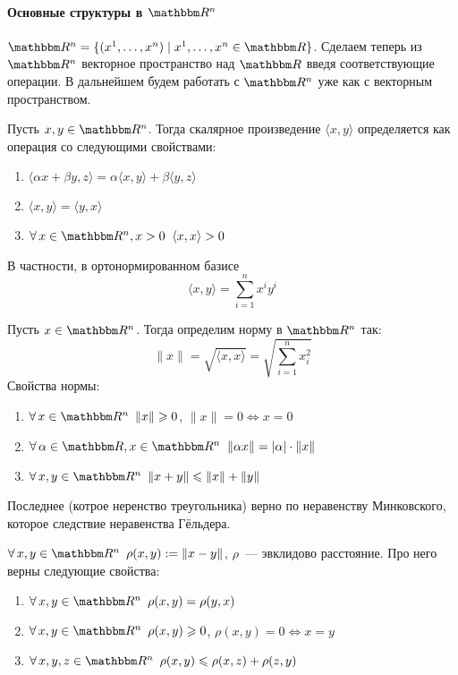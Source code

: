 \documentclass[12pt]{../../notes}
\begin{document}
\paragraph{Основные структуры в \texorpdfstring{$\R^n$}{}}

\begin{defn}\label{defn:Rn}
  $\R^n = \{ (x^1, \dotsc, x^n) \mid x^1, \dotsc, x^n \in \R \}$. Сделаем теперь из $\R^n$ векторное пространство
  над $\R$
  введя соответствующие операции. В дальнейшем будем работать с $\R^n$ уже как с векторным пространством.
\end{defn}

\begin{defn}\label{defn:scalprodRn}
  Пусть $x, y\in \R^n$. Тогда скалярное произведение $\langle x,y\rangle$ определяется как
  операция со следующими свойствами:
  \begin{enumerate}
    \item $\langle \alpha x + \beta y , z \rangle = \alpha \langle x,y\rangle + \beta \langle y,z\rangle$
    \item $\langle x , y \rangle = \langle y, x\rangle$
    \item $\forall\, x \in \R^n, x > 0 \;\; \langle x , x \rangle > 0$
  \end{enumerate}
  В частности, в ортонормированном базисе 
  \[
    \langle x, y \rangle = \sum_{i=1}^{n} x^i y^i
  \]
\end{defn}
\begin{defn}\label{defn:normRn}
  Пусть $x\in \R^n$. Тогда определим норму в $\R^n$ так:
  \[
    \| x \| = \sqrt{\langle x,x \rangle} = \sqrt{\sum_{i=1}^{n} x_i^2}
  \]
  Свойства нормы:
  \begin{enumerate}
    \item $\forall\, x\in \R^n \;\: \| x \| \geqslant 0$, $\|x\| = 0 \Leftrightarrow x = 0$
    \item $\forall\, \alpha\in\R, x\in \R^n \;\; \|\alpha x\| = |\alpha| \cdot \|x\|$
    \item $\forall\, x, y \in \R^n \;\: \|x + y\| \leqslant \|x\| + \|y\|$
  \end{enumerate}
  Последнее (котрое неренство треугольника) верно по неравенству Минковского,
  которое следствие неравенства Гёльдера. 
\end{defn}

\begin{defn}[Метрика в $\R^n$]\label{defn:rhoRn}
  $\forall\, x, y \in \R^n \;\: \rho(x,y) := \| x - y \|$, $\rho$~--- эвклидово расстояние.
  Про него верны следующие свойства:
  \begin{enumerate}
    \item $\forall\, x, y \in \R^n \;\: \rho(x,y) = \rho(y,x)$
    \item $\forall\, x, y \in \R^n \;\:\rho(x,y) \geqslant 0$, $\rho(x,y) = 0 \Leftrightarrow x = y $
    \item $\forall\, x, y, z \in \R^n \;\:\rho(x,y) \leqslant \rho(x,z) + \rho(z,y)$
  \end{enumerate}
\end{defn}
\end{document}
